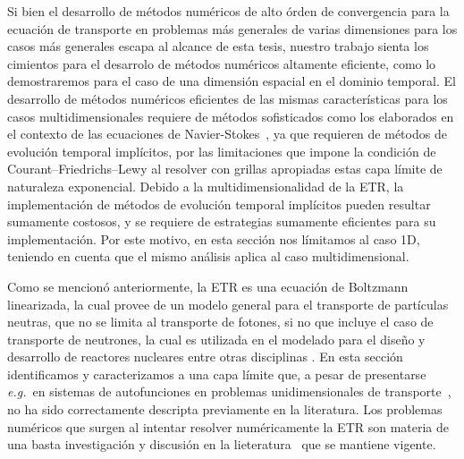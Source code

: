 Si bien el desarrollo de métodos numéricos de alto órden de 
convergencia para la ecuación de transporte en problemas más 
generales de varias dimensiones para los casos más generales 
escapa al alcance de esta tesis, nuestro trabajo 
sienta los cimientos para el desarrolo de métodos numéricos 
altamente eficiente, como lo demostraremos para el caso 
de una dimensión espacial en el dominio temporal. El desarrollo 
de métodos numéricos eficientes de las mismas características para los casos 
multidimensionales requiere de métodos sofisticados como 
los elaborados en el contexto de las ecuaciones de Navier-Stokes~\cite{Bruno2019}, 
ya que requieren de métodos de evolución temporal implícitos, por las limitaciones 
que impone la condición de Courant–Friedrichs–Lewy al resolver con grillas apropiadas 
estas capa límite de naturaleza exponencial. Debido a la multidimensionalidad 
de la ETR, la implementación de métodos de evolución temporal implícitos 
pueden resultar sumamente costosos, y se requiere de estrategias 
sumamente eficientes para su implementación. Por este motivo, 
en esta sección nos límitamos al caso 1D, teniendo en cuenta que el mismo 
análisis aplica al caso multidimensional. 


Como se mencionó anteriormente, la ETR es una ecuación de Boltzmann linearizada, 
la cual provee de un modelo general para el transporte de partículas neutras, 
que no se limita al transporte de fotones, si no que incluye el caso de 
transporte de neutrones, la cual es utilizada en el modelado 
para el diseño y desarrollo de reactores nucleares entre otras disciplinas 
\cite{Chandrasekhar1960,Case1967,Lewis1984,Petrovic1996,Hunter2015,Barichello2016,Hu2020}.  
En esta sección identificamos y caracterizamos a una capa límite 
que, a pesar de presentarse \textit{e.g.}~en sistemas de autofunciones 
en problemas unidimensionales de transporte~\cite[Cap. 4]{Case1967}, 
no ha sido correctamente descripta previamente en la literatura. 
Los problemas numéricos que surgen al intentar resolver 
numéricamente la ETR son materia de una basta investigación 
y discusión en la lieteratura~\cite{Case1967,Lewis1984,Petrovic1996,Bal2001,Hunter2015} 
que se mantiene vigente. 


